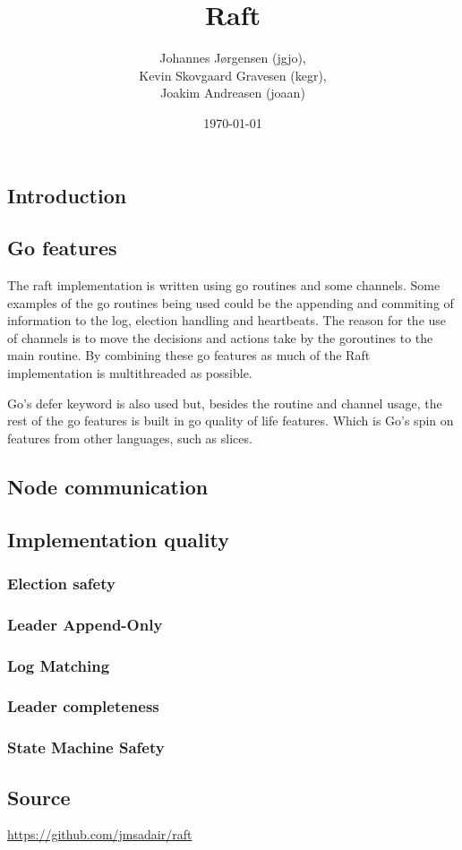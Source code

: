 \documentclass[a4paper,11pt]{article}
\title{Raft}
\author{Johannes Jørgensen (jgjo),\\ Kevin Skovgaard Gravesen (kegr),\\ Joakim Andreasen (joaan)}
\date{\today}
\begin{document}
 

\maketitle

\subsection*{Introduction}

\subsection*{Go features}
The raft implementation is written using go routines and some channels.
Some examples of the go routines being used could be the appending and commiting of information to the log, election handling and heartbeats.
The reason for the use of channels is to move the decisions and actions take by the goroutines to the main routine.
By combining these go features as much of the Raft implementation is multithreaded as possible.

Go's defer keyword is also used but, besides the routine and channel usage, the rest of the go features is built in go quality of life features.
Which is Go's spin on features from other languages, such as slices.

\subsection*{Node communication}

\subsection*{Implementation quality}

\subsubsection*{Election safety}

\subsubsection*{Leader Append-Only}

\subsubsection*{Log Matching}

\subsubsection*{Leader completeness}

\subsubsection*{State Machine Safety}

\subsection*{Source}
\href{https://github.com/jmsadair/raft}{https://github.com/jmsadair/raft}
\end{document}
